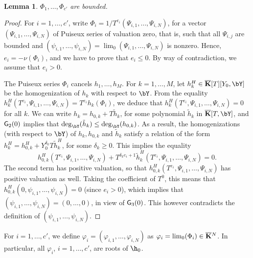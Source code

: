 \documentclass[12pt]{article}
\newtheorem{lemma}[definition]{Lemma}
\begin{document}
\begin{lemma}
   $\Phi_1,\dots,\Phi_{c'}$ are bounded.
\end{lemma}
\begin{proof}
  For $i=1,\dots,c'$, write $\Phi_i=1/T^{e_i}
  (\Psi_{i,1},\dots,\Psi_{i,N})$, for a vector
  $(\Psi_{i,1},\dots,\Psi_{i,N})$ of Puiseux series of valuation
  zero, that is, such that all $\Psi_{i,j}$ are bounded and
  $(\psi_{i,1},\dots,\psi_{i,N})=\lim_0(\Psi_{i,1},\dots,\Psi_{i,N})$
  is nonzero. Hence,
  $e_i=-\nu(\Phi_i)$, and we have to prove that $e_i \le 0$.  By way
  of contradiction, we assume that $e_i > 0$.

  The Puiseux series $\Phi_i$ cancels $h_1,\dots,h_M$. For
  $k=1,\dots,M$, let $h_k^H \in \KKbar[T][Y_0,\bY]$ be the homogenization
  of $h_k$ with respect to $\bY$. From the equality
  $h_k^H(T^{e_i},\Psi_{i,1},\dots,\Psi_{i,N})=
  T^{e_i}h_k(\Phi_i)$, we deduce that
  $h_k^H(T^{e_i},\Psi_{i,1},\dots,\Psi_{i,N})=0$ for all $k$. We
  can write $h_k = h_{0,k} + T \tilde h_k$, for some polynomial
  $\tilde h_k$ in $\KKbar[T,\bY]$, and ${\sf G}_2(0)$ implies that
  $\deg_\bY(\tilde h_k) \le \deg_\bY(h_{0,k})$. As a result, the
  homogenizations (with respect to $\bY$) of $h_{k},h_{0,k}$ and $\tilde
  h_k$ satisfy a relation of the form $h^H_k = h_{0,k}^H +
  Y_0^{\delta_k} T \tilde h^H_k$, for some $\delta_k \ge 0$. This
  implies the equality
  $$h_{0,k}^H(T^{e_i},\Psi_{i,1},\dots,\Psi_{i,N}) + T^{\delta_k
    e_i+1}\tilde h_k^H(T^{e_i},\Psi_{i,1},\dots,\Psi_{i,N})=0.$$
  The second term has positive valuation, so that
  $h_{0,k}^H(T^{e_i},\Psi_{i,1},\dots,\Psi_{i,N})$ has positive
  valuation as well. Taking the coefficient of $T^0$, this means 
  that $h_{0,k}^H(0,\psi_{i,1},\dots,\psi_{i,N})=0$ (since $e_i > 0$), which implies 
  that $(\psi_{i,1},\dots,\psi_{i,N})=(0,\dots,0)$, in view of ${\sf G}_3(0)$.
  This however contradicts the definition of $(\psi_{i,1},\dots,\psi_{i,N})$.
\end{proof}

For $i=1,\dots,c'$, we define $\varphi_i =
(\varphi_{i,1},\dots,\varphi_{i,N})$ as $\varphi_i=\lim_0(\Phi_i)\in
\overline{\mathbf{K}}{}^N$. In particular, all $\varphi_i$, $i=1,\dots,c'$, are roots
of $\h_0$.
\end{document}
